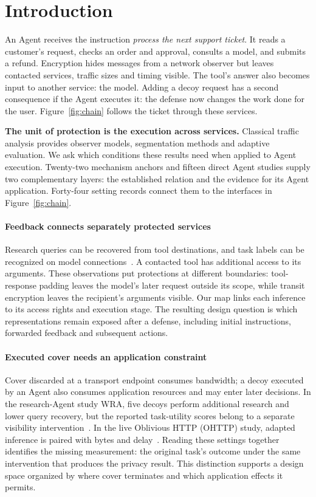 \section{Introduction}
An Agent receives the instruction \emph{process the next support ticket}. It reads a customer's request, checks an order and approval, consults a model, and submits a refund. Encryption hides messages from a network observer but leaves contacted services, traffic sizes and timing visible. The tool's answer also becomes input to another service: the model. Adding a decoy request has a second consequence if the Agent executes it: the defense now changes the work done for the user. Figure~\ref{fig:chain} follows the ticket through these services.



\textbf{The unit of protection is the execution across services.} Classical traffic analysis provides observer models, segmentation methods and adaptive evaluation. We ask which conditions these results need when applied to Agent execution. Twenty-two mechanism anchors and fifteen direct Agent studies supply two complementary layers: the established relation and the evidence for its Agent application. Forty-four setting records connect them to the interfaces in Figure~\ref{fig:chain}.

\paragraph{Feedback connects separately protected services}
Research queries can be recovered from tool destinations, and task labels can be recognized on model connections~\cite{jeong2026wra,li2026ant,pouryousef2026traffic}. A contacted tool has additional access to its arguments. These observations put protections at different boundaries: tool-response padding leaves the model's later request outside its scope, while transit encryption leaves the recipient's arguments visible. Our map links each inference to its access rights and execution stage. The resulting design question is which representations remain exposed after a defense, including initial instructions, forwarded feedback and subsequent actions.

\paragraph{Executed cover needs an application constraint}
Cover discarded at a transport endpoint consumes bandwidth; a decoy executed by an Agent also consumes application resources and may enter later decisions. In the research-Agent study WRA, five decoys perform additional research and lower query recovery, but the reported task-utility scores belong to a separate visibility intervention~\cite{jeong2026wra}. In the live Oblivious HTTP (OHTTP) study, adapted inference is paired with bytes and delay~\cite{dangol2026workflow}. Reading these settings together identifies the missing measurement: the original task's outcome under the same intervention that produces the privacy result. This distinction supports a design space organized by where cover terminates and which application effects it permits.

